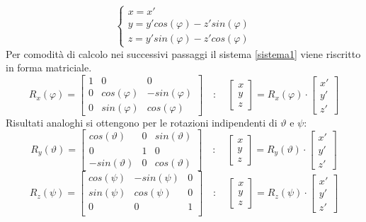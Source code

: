 \documentclass[12pt,twoside,openright]{report}
\begin{document}
\begin{equation}\label{sistema1}
\begin{cases} 
x=x' \\ 
y=y'cos(\varphi)-z'sin(\varphi) \\ 
z=y'sin(\varphi)-z'cos(\varphi)
\end{cases} 
\end{equation}
Per comodità di calcolo nei successivi passaggi il sistema \eqref{sistema1} viene riscritto in forma matriciale.
\begin{equation}\label{rx}
R_x(\varphi)=
\begin{bmatrix}
1 & 0 & 0\\
0 & cos(\varphi) & -sin(\varphi)\\
0 & sin(\varphi) & cos(\varphi)
\end{bmatrix}
\quad : \quad
\begin{bmatrix}
x \\
y \\
z 
\end{bmatrix}
=R_x(\varphi)\cdot\begin{bmatrix}
x' \\
y' \\
z' 
\end{bmatrix}
\end{equation}
Risultati analoghi si ottengono per le rotazioni indipendenti di $\vartheta$ e $\psi$:
\begin{equation}\label{ry}
R_y(\vartheta)=
\begin{bmatrix}
cos(\vartheta) & 0 & sin(\vartheta)\\
0 & 1 & 0\\
-sin(\vartheta) & 0 & cos(\vartheta)
\end{bmatrix}
\quad : \quad
\begin{bmatrix}
x \\
y \\
z 
\end{bmatrix}
=R_y(\vartheta)\cdot\begin{bmatrix}
x' \\
y' \\
z' 
\end{bmatrix}
\end{equation}
\begin{equation}\label{rz}
R_z(\psi)=
\begin{bmatrix}
cos(\psi) & -sin(\psi) & 0\\
sin(\psi) & cos(\psi) & 0\\
0 & 0 & 1\\
\end{bmatrix}
\quad : \quad
\begin{bmatrix}
x \\
y \\
z 
\end{bmatrix}
=R_z(\psi)\cdot\begin{bmatrix}
x' \\
y' \\
z' 
\end{bmatrix}
\end{equation}
\end{document}
